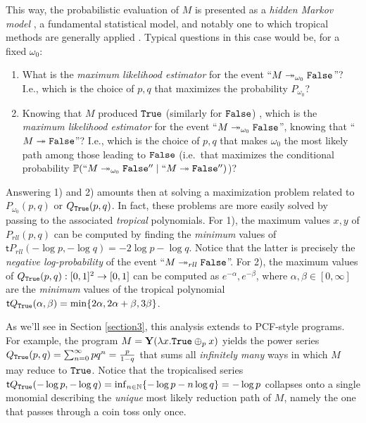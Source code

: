 This way, the probabilistic evaluation of $M$ is presented as a \emph{hidden Markov model} \cite{Baum1966}, a fundamental statistical model, and notably one to which tropical methods are generally applied \cite{Pachter2004}.
Typical questions in this case would be, for a fixed $\omega_0$:
%
\begin{enumerate}
 \item What is the \emph{maximum likelihood estimator} for the event ``$M\twoheadrightarrow_{\omega_0} \mathtt{False}$''?
 I.e., which is the choice of $p,q$ that maximizes the probability $P_{\omega_0}$?
 \item 
Knowing that $M$ produced $\mathtt{True}$ (similarly for $\mathtt{False}$) , which is the \emph{maximum likelihood estimator} for the event ``$M\twoheadrightarrow_{\omega_0}\mathtt{False}$'', knowing that ``$M\twoheadrightarrow \mathtt{False}$''?
I.e., which is the choice of $p,q$ that makes $\omega_0$ the most likely path among those leading to $\mathtt{False}$ (i.e.\ that maximizes the conditional probability $\mathbb{P}(``M\twoheadrightarrow_{\omega_0} \mathtt{False}'' \mid ``M\twoheadrightarrow \mathtt{False}'')$)?
\end{enumerate}


Answering 1) and 2) amounts then at solving a maximization problem related to $P_{\omega_{0}}(p,q)$ or $Q_{\mathtt{True}}(p,q)$. In fact, these problems are more easily solved by passing to the associated \emph{tropical} polynomials.
For 1), the maximum values $x,y$ of $P_{rll}(p,q)$ can be computed by finding the \emph{minimum} values of $\mathsf tP_{rll}(-\log p, -\log q)= -2\log p- \log q$. Notice that the latter is precisely the \emph{negative log-probability} of the event ``$M\twoheadrightarrow_{rll} \mathtt{False}$''. For 2), the maximum values of $Q_{\mathtt{True}}(p,q): [0,1]^{2}\to [0,1]$ can be computed as $e^{-\alpha},e^{-\beta}$, where $\alpha,\beta\in[0,\infty]$ are the \emph{minimum} values of the tropical polynomial 
$\mathsf t Q_{\mathtt{True}}(\alpha,\beta) = \min \{ 2\alpha, 2\alpha+\beta, 3\beta\}$.

As we'll see in Section \ref{section3}, this analysis extends to PCF-style programs. For example, the program $M=\mathbf Y(\lambda x.\mathtt{True} \oplus_{p} x)$ yields the power series $Q_{\mathtt{True}}(p,q)=\sum_{n=0}^{\infty}pq^{n}=\frac{p}{1-q}$ that sums all \emph{infinitely many} ways in which $M$ may reduce to $\mathtt{True}$. Notice that the tropicalised series $\mathsf tQ_{\mathtt{True}}(-\log p,-\log q)=\inf_{n\in \mathbb N}\{-\log p -n\log q\}=-\log p$ collapses onto a single monomial describing the \emph{unique} most likely reduction path of $M$, namely the one that passes through a coin toss only once. 
%


